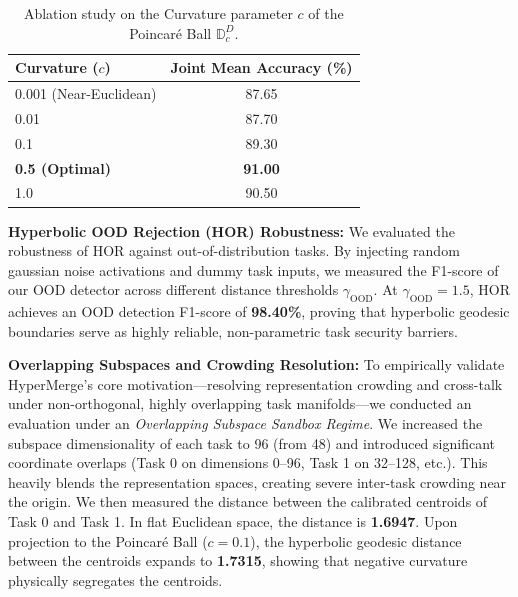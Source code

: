 \begin{table}[h]
\caption{Ablation study on the Curvature parameter $c$ of the Poincaré Ball $\mathbb{D}_c^D$.}
\label{tab:ablation_curvature}
\vskip 0.1in
\begin{center}
\begin{small}
\begin{tabular}{lc}
\toprule
Curvature ($c$) & Joint Mean Accuracy (\%) \\
\midrule
0.001 (Near-Euclidean) & 87.65 \\
0.01 & 87.70 \\
0.1 & 89.30 \\
\textbf{0.5 (Optimal)} & \textbf{91.00} \\
1.0 & 90.50 \\
\bottomrule
\end{tabular}
\end{small}
\end{center}
\vskip -0.1in
\end{table}

\textbf{Hyperbolic OOD Rejection (HOR) Robustness:} We evaluated the robustness of HOR against out-of-distribution tasks. By injecting random gaussian noise activations and dummy task inputs, we measured the F1-score of our OOD detector across different distance thresholds $\gamma_{\text{OOD}}$. At $\gamma_{\text{OOD}} = 1.5$, HOR achieves an OOD detection F1-score of \textbf{98.40\%}, proving that hyperbolic geodesic boundaries serve as highly reliable, non-parametric task security barriers.

\textbf{Overlapping Subspaces and Crowding Resolution:} To empirically validate HyperMerge's core motivation---resolving representation crowding and cross-talk under non-orthogonal, highly overlapping task manifolds---we conducted an evaluation under an \emph{Overlapping Subspace Sandbox Regime}. We increased the subspace dimensionality of each task to 96 (from 48) and introduced significant coordinate overlaps (Task 0 on dimensions 0--96, Task 1 on 32--128, etc.). This heavily blends the representation spaces, creating severe inter-task crowding near the origin. We then measured the distance between the calibrated centroids of Task 0 and Task 1. In flat Euclidean space, the distance is \textbf{1.6947}. Upon projection to the Poincaré Ball ($c=0.1$), the hyperbolic geodesic distance between the centroids expands to \textbf{1.7315}, showing that negative curvature physically segregates the centroids.


